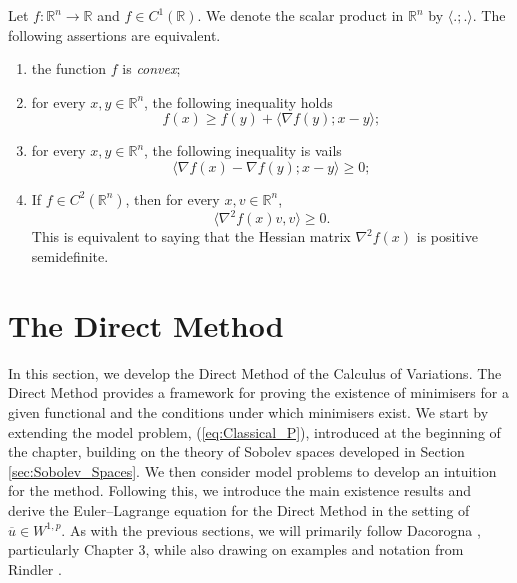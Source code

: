 \begin{theorem}
    Let $f:\mathbb{R}^n \rightarrow \mathbb{R}$ and $f \in C^1(\mathbb{R})$. We denote the scalar product in $\mathbb{R}^n$ by $\langle.;.\rangle$. The following assertions are equivalent.
    \begin{enumerate}
        \item[(i)] the function $f$ is \emph{convex};
        \item[(ii)] for every $x,y\in\mathbb{R}^n$, the following inequality holds
        \[
        f(x) \ge f(y) + \langle \nabla f(y);x-y\rangle;
        \]
        \item[(iii)] for every $x,y\in\mathbb{R}^n$, the following inequality is vails
        \[
        \langle \nabla f(x) - \nabla f(y);x-y\rangle \geq 0;
        \]
        \item[(iv)] If $f\in C^2(\mathbb{R}^n)$, then for every $x,v\in\mathbb{R}^n$,
        \[
            \langle \nabla^2 f(x)v,v\rangle \geq 0.
        \]
        This is equivalent to saying that the Hessian matrix $\nabla^2 f(x)$ is positive semidefinite.
    \end{enumerate}
\end{theorem}

\section{The Direct Method}
\label{sec:The_Direct_Method}

In this section, we develop the Direct Method of the Calculus of Variations. The Direct Method provides a framework for proving the existence of minimisers for a given functional and the conditions under which minimisers exist. We start by extending the model problem, (\ref{eq:Classical_P}), introduced at the beginning of the chapter, building on the theory of Sobolev spaces developed in Section \ref{sec:Sobolev_Spaces}. We then consider model problems to develop an intuition for the method. Following this, we introduce the main existence results and derive the Euler--Lagrange equation for the Direct Method in the setting of $\overline{u} \in W^{1,p}$. As with the previous sections, we will primarily follow Dacorogna \cite{dacorogna}, particularly Chapter 3, while also drawing on examples and notation from Rindler \cite{rindler}.


